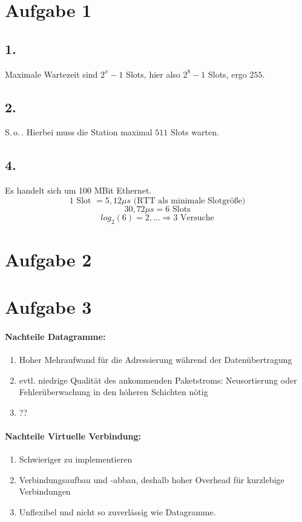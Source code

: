 \section{Aufgabe 1}

\subsection{1.}
Maximale Wartezeit sind $2^{x}-1$ Slots, hier also $2^8-1$ Slots, ergo $255$.

\subsection{2.}
S.\,o.\,. Hierbei muss die Station maximal $511$ Slots warten.

\subsection{4.}
Es handelt sich um 100 MBit Ethernet.
\[ 
    1 \text{ Slot } = 5,12 \mu s \text{ (RTT als minimale Slotgröße)}
\]
\[ 
    30,72 \mu s = 6 \text{ Slots}
\]
\[  
    log_2(6) = 2,\ldots \Rightarrow 3 \text{ Versuche}
\]


\section{Aufgabe 2}

\section{Aufgabe 3}

\paragraph{Nachteile Datagramme:}
\begin{enumerate}
\item Hoher Mehraufwand für die Adressierung während der Datenübertragung
\item evtl. niedrige Qualität des ankommenden Paketstroms:  Neusortierung oder Fehlerüberwachung in den höheren Schichten nötig
\item ??
\end{enumerate}

\paragraph{Nachteile Virtuelle Verbindung:}
\begin{enumerate}
\item Schwieriger zu implementieren
\item Verbindungsaufbau und -abbau, deshalb hoher Overhead für kurzlebige Verbindungen
\item Unflexibel und nicht so zuverlässig wie Datagramme.
\end{enumerate}